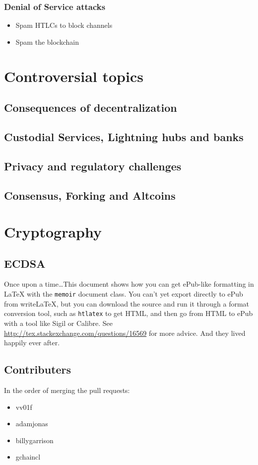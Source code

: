 \documentclass[a4paper,12pt,oneside,openany]{book}
\begin{document}
\subsection{Denial of Service attacks}
\begin{itemize}
\item Spam HTLCs to block channels
\item Spam the blockchain
\end{itemize}
\chapter{Controversial topics}
\section{Consequences of decentralization}
\section{Custodial Services, Lightning hubs and banks}
\section{Privacy and regulatory challenges}
\section{Consensus, Forking and Altcoins}


\appendix
\chapter{Cryptography}
\section{ECDSA}

Once upon a time\ldots This document shows how you can get ePub-like formatting in \LaTeX{} with the \verb|memoir| document class. You can't yet export directly to ePub from writeLaTeX, but you can download the source and run it through a format conversion tool, such as \verb|htlatex| to get HTML, and then go from HTML to ePub with a tool like Sigil or Calibre. See \url{http://tex.stackexchange.com/questions/16569} for more advice. And they lived happily ever after.

\appendix
\section{Contributers}
In the order of merging the pull requests:
\begin{itemize}
\item vv01f
\item adamjonas
\item billygarrison
\item gchaincl
\end{itemize}
\end{document}
